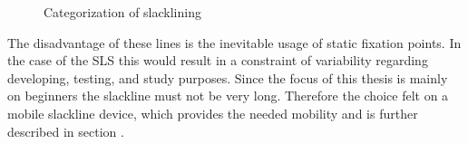 \begin{figure}[htb]
\begin{minipage}[t]{0.45\linewidth}
		\label{fig:urbanline}
	\end{minipage}
	\caption{Categorization of slacklining}
	\label{fig:slacklineCategorization}
\end{figure}

The disadvantage of these lines is the inevitable usage of static fixation points. In the case of the SLS this would result in a constraint of variability regarding developing, testing, and study purposes. Since the focus of this thesis is mainly on beginners the slackline must not be very long. Therefore the choice felt on a mobile slackline device, which provides the needed mobility and is further described in section \textit{}.
